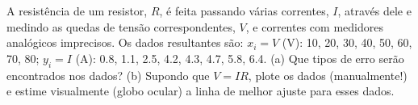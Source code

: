 A resistência de um resistor, $R$, é feita passando várias correntes, $I$, através dele e medindo as quedas de tensão correspondentes, $V$, e correntes com medidores analógicos imprecisos. Os dados resultantes são: $x_i = V$ (V): 10, 20, 30, 40, 50, 60, 70, 80; $y_i = I$ (A): 0.8, 1.1, 2.5, 4.2, 4.3, 4.7, 5.8, 6.4. (a) Que tipos de erro serão encontrados nos dados? (b) Supondo que $V = IR$, plote os dados (manualmente!) e estime visualmente (globo ocular) a linha de melhor ajuste para esses dados.


